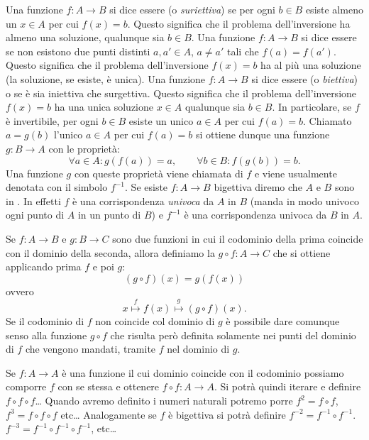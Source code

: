 Una funzione $f\colon A \to B$ si dice essere  (o \emph{suriettiva})
se per ogni $b\in B$ esiste almeno un $x\in A$ per cui $f(x)=b$. Questo
significa che il problema dell'inversione ha almeno una soluzione, qualunque
sia $b\in B$.
Una funzione $f\colon A \to B$ si dice essere 
se non esistono due punti distinti $a,a' \in A$, $a\neq a'$ tali
che $f(a) = f(a')$. Questo significa che il problema dell'inversione
$f(x)=b$ ha al più una soluzione (la soluzione, se esiste, è unica).
Una funzione $f\colon A \to B$ si dice essere 
(o \emph{biettiva})
%
%
%
%
%
%
o
%
se è sia iniettiva che surgettiva. Questo significa
che il problema dell'inversione $f(x)=b$ ha una unica soluzione $x\in A$
qualunque sia $b\in B$. In particolare, se $f$ è invertibile, per ogni $b\in B$ esiste
un unico $a\in A$ per cui $f(a)=b$.
Chiamato $a=g(b)$ l'unico $a\in A$ per cui $f(a)=b$
si ottiene dunque una funzione $g\colon B\to A$ con le proprietà:
\[
  \forall a\in A\colon g(f(a)) = a, \qquad
  \forall b\in B\colon f(g(b)) = b.
\]
Una funzione $g$ con queste proprietà viene chiamata 
di $f$ e viene usualmente denotata con il simbolo $f^{-1}$.
%
Se esiste $f\colon A\to B$ bigettiva diremo che $A$ 
e $B$ sono in .
In effetti $f$ è una corrispondenza \emph{univoca} da $A$ in $B$
(manda in modo univoco ogni punto di $A$ in un punto di $B$)
e $f^{-1}$ è una corrispondenza univoca da $B$ in $A$.

Se $f\colon A \to B$ e $g\colon B \to C$ sono due funzioni in cui
il codominio della prima coincide con il dominio della seconda, allora
definiamo la  $g\circ f\colon A \to C$
che si ottiene applicando prima $f$ e poi $g$:
\[
  (g\circ f)(x) = g(f(x))
\]
ovvero 
\[
  x \stackrel f \mapsto f(x) \stackrel g \mapsto (g\circ f)(x).  
\]
Se il codominio di $f$ non coincide col dominio
di $g$ è possibile dare comunque senso alla funzione $g\circ f$
che risulta però definita solamente nei punti del dominio di
$f$ che vengono mandati, tramite $f$ nel dominio di $g$.

Se $f\colon A\to A$ è una funzione il cui dominio coincide con il codominio
possiamo comporre $f$ con se stessa e ottenere $f\circ f \colon A\to A$.
Si potrà quindi iterare e definire $f\circ f \circ f$\dots
Quando avremo definito i numeri naturali potremo porre $f^2 = f\circ f$,
$f^3= f\circ f \circ f$ etc\dots
Analogamente se $f$ è bigettiva si potrà definire $f^{-2} = f^{-1}\circ f^{-1}$.
$f^{-3}=f^{-1}\circ f^{-1}\circ f^{-1}$, etc\dots

